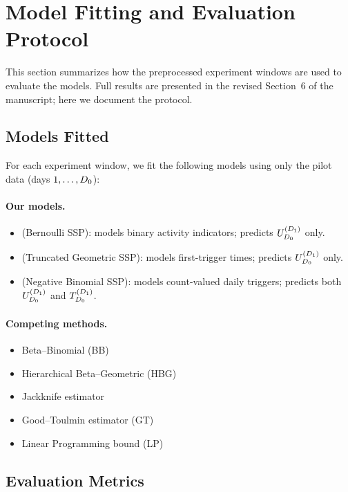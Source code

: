 \section{Model Fitting and Evaluation Protocol}
\label{sec:fitting}

This section summarizes how the preprocessed experiment windows
are used to evaluate the models.
Full results are presented in the revised Section~6 of the
manuscript; here we document the protocol.

\subsection{Models Fitted}

For each experiment window, we fit the following models using
only the pilot data (days $1, \ldots, D_0$):

\paragraph{Our models.}
\begin{itemize}[leftmargin=*]
  \item \textbf{\bemodel} (Bernoulli SSP): models binary
        activity indicators; predicts $U_{D_0}^{(D_1)}$ only.
  \item \textbf{\tgmodel} (Truncated Geometric SSP): models
        first-trigger times; predicts $U_{D_0}^{(D_1)}$ only.
  \item \textbf{\nbmodel} (Negative Binomial SSP): models
        count-valued daily triggers; predicts both $U_{D_0}^{(D_1)}$
        and $T_{D_0}^{(D_1)}$.
\end{itemize}

\paragraph{Competing methods.}
\begin{itemize}[leftmargin=*]
  \item Beta--Binomial (BB)
  \item Hierarchical Beta--Geometric (HBG)
  \item Jackknife estimator
  \item Good--Toulmin estimator (GT)
  \item Linear Programming bound (LP)
\end{itemize}

\subsection{Evaluation Metrics}

